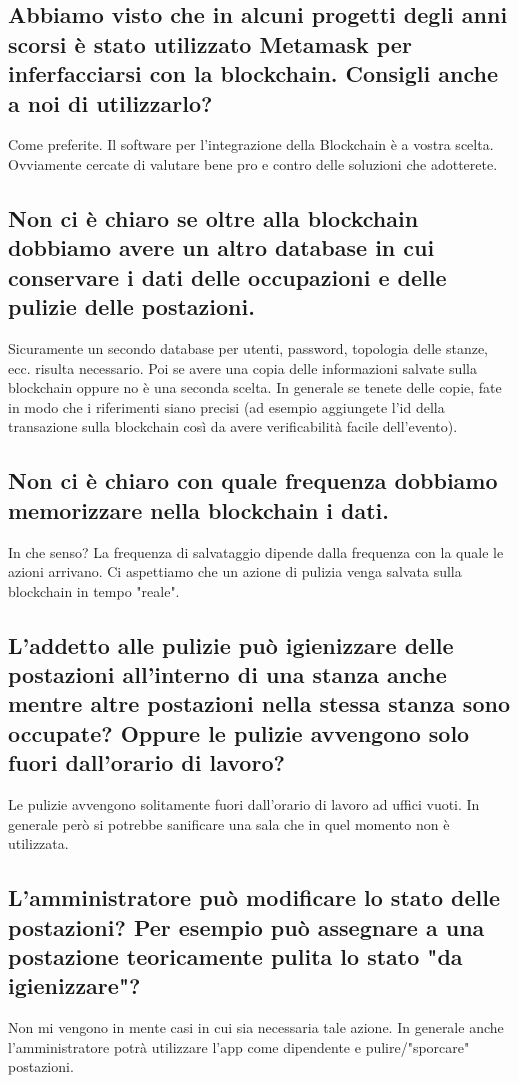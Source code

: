 \subsection*{Abbiamo visto che in alcuni progetti degli anni scorsi è stato utilizzato Metamask per inferfacciarsi con la blockchain. Consigli anche a noi di utilizzarlo?}
Come preferite. Il software per l'integrazione della Blockchain è a vostra scelta. Ovviamente cercate di valutare bene pro e contro delle soluzioni che adotterete.
\subsection*{Non ci è chiaro se oltre alla blockchain dobbiamo avere un altro database in cui conservare i dati delle occupazioni e delle pulizie delle postazioni.}
Sicuramente un secondo database per utenti, password, topologia delle stanze, ecc. risulta necessario. Poi se avere una copia delle informazioni salvate sulla blockchain oppure no è una seconda scelta. In generale se tenete delle copie, fate in modo che i riferimenti siano precisi (ad esempio aggiungete l'id della transazione sulla blockchain così da avere verificabilità facile dell'evento).
\subsection*{Non ci è chiaro con quale frequenza dobbiamo memorizzare nella blockchain i dati.}
 In che senso? La frequenza di salvataggio dipende dalla frequenza con la quale le azioni arrivano. Ci aspettiamo che un azione di pulizia venga salvata sulla blockchain in tempo "reale".
\subsection*{L'addetto alle pulizie può igienizzare delle postazioni all'interno di una stanza anche mentre altre postazioni nella stessa stanza sono occupate? Oppure le pulizie avvengono solo fuori dall'orario di lavoro?}
Le pulizie avvengono solitamente fuori dall'orario di lavoro ad uffici vuoti. In generale però si potrebbe sanificare una sala che in quel momento non è utilizzata.
\subsection*{L'amministratore può modificare lo stato delle postazioni? Per esempio può assegnare a una postazione teoricamente pulita lo stato "da igienizzare"?}
Non mi vengono in mente casi in cui sia necessaria tale azione. In generale anche l'amministratore potrà utilizzare l'app come dipendente e pulire/"sporcare" postazioni.
